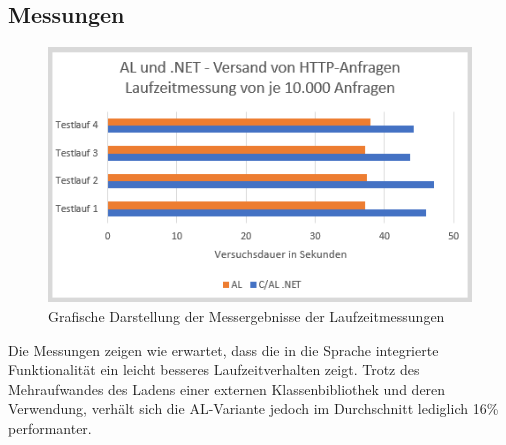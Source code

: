 \subsection{Messungen}
\begin{table}[H]
	\label{tab:Test1Measurements}
	\caption{Ergebnisse für 10000 Anfragen, Messwerte in Sekunden}
	\centering
\end{table}

\begin{figure}[h]
	\centering
	\includegraphics{images/Tests-WS}
	\caption{Grafische Darstellung der Messergebnisse der Laufzeitmessungen}
	\label{fig:Test1Graphical}
\end{figure}

Die Messungen zeigen wie erwartet, dass die in die Sprache integrierte Funktionalität ein leicht besseres Laufzeitverhalten zeigt. Trotz des Mehraufwandes des Ladens einer externen Klassenbibliothek und deren Verwendung, verhält sich die AL-Variante jedoch im Durchschnitt lediglich 16\% performanter.
\pagebreak

